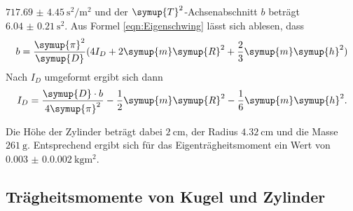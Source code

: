   $\qty{717,69(4.45)}{\second\squared \per \meter\squared}$ und der $\symup{T}^2$-Achsenabschnitt $b$ beträgt $\qty{6,04(0.21)}{\second\squared}$.
  Aus Formel \ref{eqn:Eigenschwing} lässt sich ablesen, dass
  \begin{equation}
    b=\frac{\symup{\pi}^2}{\symup{D}}(4I_D+2\symup{m}\symup{R}^2+\frac{2}{3}\symup{m}\symup{h}^2)
  \end{equation}
  Nach $I_D$ umgeformt ergibt sich dann
  \begin{equation}
    I_D=\frac{\symup{D}\cdot b}{4\symup{\pi}^2}-\frac{1}{2}\symup{m}\symup{R}^2-\frac{1}{6}\symup{m}\symup{h}^2 \text{.}
    \label{eqn:Eigenträgheitsmoment}
  \end{equation}
  
  \noindent Die Höhe der Zylinder beträgt dabei $\qty{2}{\centi\meter}$, der Radius $\qty{4,32}{\centi\meter}$ und die Masse $\qty{261}{\gram}$.
  Entsprechend ergibt sich für das Eigenträgheitsmoment ein Wert von $\qty{0.003(0.0002)}{\kilo\gram\meter\squared}$.

  \subsection{Trägheitsmomente von Kugel und Zylinder}

 

